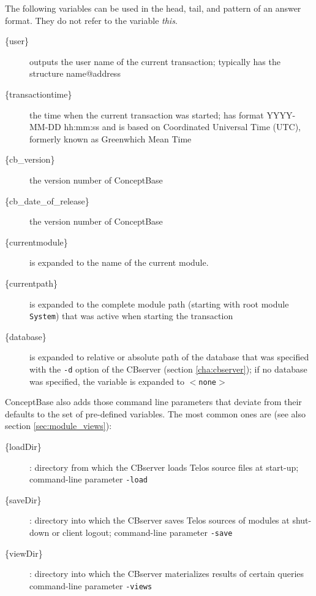 The following variables can be used in the head, tail, and pattern of an answer format. They
do not refer to the variable {\em this}.

\begin{description}

\item[\{user\}]
outputs the user name of the current transaction; typically has the structure name@address

\item[\{transactiontime\}]
the time when the current transaction was started; has format YYYY-MM-DD hh:mm:ss and is based on Coordinated Universal Time (UTC),
formerly known as Greenwhich Mean Time

\item[\{cb\_version\}]
the version number of ConceptBase

\item[\{cb\_date\_of\_release\}]
the version number of ConceptBase

\item[\{currentmodule\}] is expanded to the name of the current module.

\item[\{currentpath\}] is expanded to the complete module path (starting with root module
   {\tt System}) that was active when starting the transaction

\item[\{database\}] is expanded to relative or absolute path of the database that was specified with the
   {\tt -d} option of the CBserver (section \ref{cha:cbserver}); if no database was specified, the
   variable is expanded to {\tt $<$none$>$}

\end{description}

ConceptBase also adds those command line parameters that deviate from their defaults to the set
of pre-defined variables. The most common ones are (see also section \ref{sec:module_views}):

\begin{description}

\item[\{loadDir\}]: directory from which the CBserver loads Telos source files at start-up;
                    command-line parameter {\tt -load}

\item[\{saveDir\}]: directory into which the CBserver saves Telos sources of modules at shut-down
                    or client logout;
                    command-line parameter {\tt -save}

\item[\{viewDir\}]: directory into which the CBserver materializes results of certain queries
                    command-line parameter {\tt -views}

\end{description}

